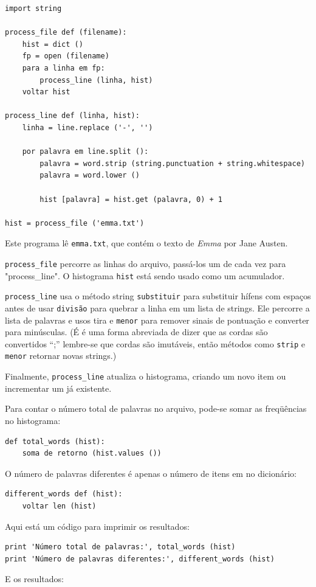 \documentclass[10pt]{book}
\begin{document}
\begin{exercise}
\begin{v erbatim}
\begin{verbatim}
import string

process_file def (filename):
    hist = dict ()
    fp = open (filename)
    para a linha em fp:
        process_line (linha, hist)
    voltar hist

process_line def (linha, hist):
    linha = line.replace ('-', '')
    
    por palavra em line.split ():
        palavra = word.strip (string.punctuation + string.whitespace)
        palavra = word.lower ()

        hist [palavra] = hist.get (palavra, 0) + 1

hist = process_file ('emma.txt')
\end{verbatim}
%
Este programa lê {\tt emma.txt}, que contém o texto de {\em
  Emma} por Jane Austen.

\Verb "process_file" percorre as linhas do arquivo,
passá-los um de cada vez para \verbo "process_line". O histograma
{\tt hist} está sendo usado como um acumulador.

\Verb "process_line" usa o método string {\tt substituir} para substituir
hífens com espaços antes de usar {\tt divisão} para quebrar a linha em um
lista de strings. Ele percorre a lista de palavras e usos {tira \tt}
e {\tt menor} para remover sinais de pontuação e converter para minúsculas. (É
é uma forma abreviada de dizer que as cordas são convertidos ``;'' lembre-se que
cordas são imutáveis, então métodos como {\tt strip} e {\tt menor}
retornar novas strings.)

Finalmente, \verb "process_line" atualiza o histograma, criando um novo
item ou incrementar um já existente.

Para contar o número total de palavras no arquivo, pode-se somar
as freqüências no histograma:

\begin{verbatim}
def total_words (hist):
    soma de retorno (hist.values ​​())
\end{verbatim}
%
O número de palavras diferentes é apenas o número de itens em
no dicionário:

\begin{verbatim}
different_words def (hist):
    voltar len (hist)
\end{verbatim}
%
Aqui está um código para imprimir os resultados:

\begin{verbatim}
print 'Número total de palavras:', total_words (hist)
print 'Número de palavras diferentes:', different_words (hist)
\end{verbatim}
%
E os resultados:


\end{v erbatim}
\end{exercise}
\end{document}
